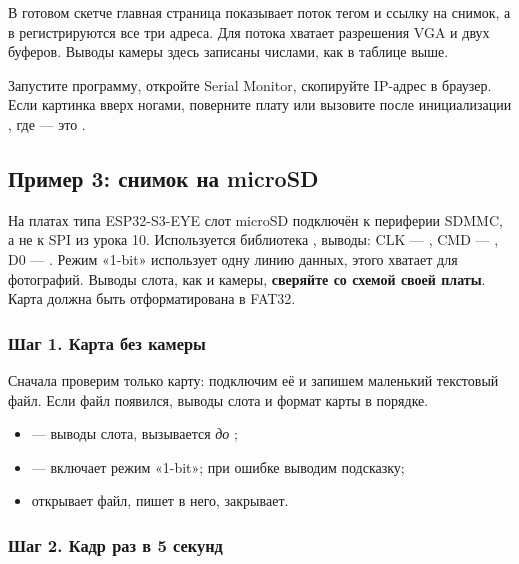 В готовом скетче главная страница показывает поток тегом  и ссылку на снимок,
а в  регистрируются все три адреса. Для потока хватает разрешения VGA и двух буферов.
Выводы камеры здесь записаны числами, как в таблице выше.


Запустите программу, откройте Serial Monitor, скопируйте IP-адрес в браузер. Если картинка вверх ногами,
поверните плату или вызовите после инициализации , где  --- это .

\subsection{Пример 3: снимок на microSD}

На платах типа ESP32-S3-EYE слот microSD подключён к периферии SDMMC, а не к SPI из урока 10. Используется
библиотека , выводы: CLK --- , CMD --- , D0 --- . Режим «1-bit» использует одну
линию данных, этого хватает для фотографий. Выводы слота, как и камеры, \textbf{сверяйте со схемой
своей платы}. Карта должна быть отформатирована в FAT32.

\subsubsection{Шаг 1. Карта без камеры}

Сначала проверим только карту: подключим её и запишем маленький текстовый файл. Если файл появился, выводы
слота и формат карты в порядке.


\begin{itemize}[leftmargin=*]
  \item {} --- выводы слота, вызывается \emph{до} ;
  \item {} ---  включает режим «1-bit»; при ошибке выводим подсказку;
  \item {} открывает файл,  пишет в него,  закрывает.
\end{itemize}

\subsubsection{Шаг 2. Кадр раз в 5 секунд}

